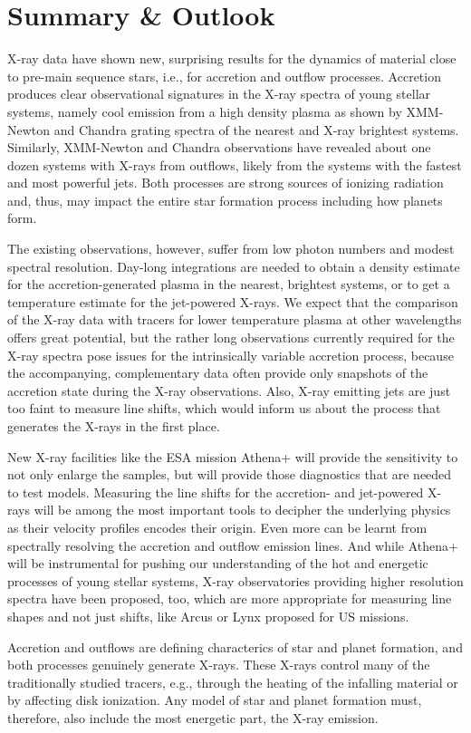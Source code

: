 
\section{Summary \& Outlook}

X-ray data have shown new, surprising results for the dynamics of material close to pre-main sequence stars, i.e., for accretion and outflow processes. Accretion produces clear observational signatures in the X-ray spectra of young stellar systems, namely cool emission from a high density plasma as shown by XMM-Newton and Chandra grating spectra of the nearest and X-ray brightest systems. Similarly, XMM-Newton and Chandra observations have revealed about one dozen systems with  X-rays from outflows, likely from the systems with the fastest and most powerful jets.
Both processes are strong sources of ionizing radiation and, thus, may impact the entire star formation process including how planets form.

The existing observations, however, suffer from low photon numbers and modest spectral resolution. Day-long integrations are needed to obtain a density estimate for the accretion-generated plasma in the nearest, brightest systems, or to get a temperature estimate for the jet-powered X-rays. We expect that the comparison of the X-ray data with tracers for lower temperature plasma at other wavelengths offers great potential, but the rather long observations currently required for the X-ray spectra pose issues for the intrinsically variable accretion process, because the accompanying, complementary data often provide only snapshots of the accretion state during the X-ray observations. Also, X-ray emitting jets are just too faint to measure line shifts, which would inform us about the process that generates the X-rays in the first place. 

New X-ray facilities like the ESA mission Athena+ will provide the sensitivity to not only enlarge the samples, but will provide those diagnostics that are needed to test models. Measuring the line shifts for the accretion- and jet-powered X-rays will be among the most important tools to decipher the underlying physics as their velocity profiles 
encodes their origin. Even more can be learnt from spectrally resolving the accretion and outflow emission lines. And while Athena+ will be instrumental for pushing our understanding of the hot and energetic processes of young stellar systems, X-ray observatories providing higher resolution spectra have been proposed, too, which are more appropriate for measuring line shapes and not just shifts, like Arcus or Lynx proposed for US missions.

Accretion and outflows are defining characterics of star and planet formation, and both processes genuinely generate X-rays. These X-rays control many of the traditionally studied tracers, e.g., through the heating of the infalling  material or by affecting disk ionization. Any model of star and planet formation must, therefore, also include the most energetic part, the X-ray emission.

